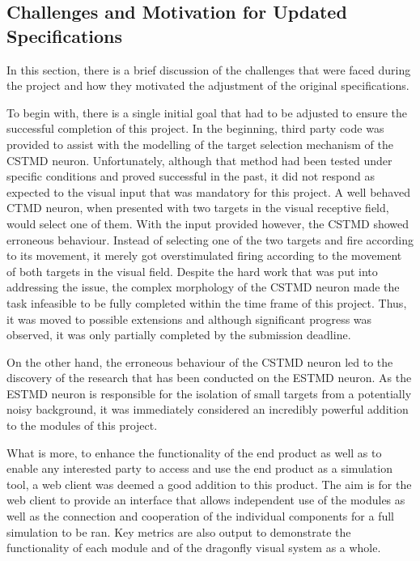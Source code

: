 \documentclass[a4paper,11pt]{article}
\begin{document}
\subsection{Challenges and Motivation for Updated Specifications}
In this section, there is a brief discussion of the challenges that were faced during the project and how they motivated the adjustment of the original specifications.\par
	To begin with, there is a single initial goal that had to be adjusted to ensure the successful completion of this project. In the beginning, third party code was provided to assist with the modelling of the target selection mechanism of the CSTMD neuron. Unfortunately, although that method had been tested under specific conditions and proved successful in the past, it did not respond as expected to the visual input that was mandatory for this project. A well behaved CTMD neuron, when presented with two targets in the visual receptive field, would select one of them. With the input provided however, the CSTMD showed erroneous behaviour. Instead of selecting one of the two targets and fire according to its movement, it merely got overstimulated firing according to the movement of both targets in the visual field. Despite the hard work that was put into addressing the issue, the complex morphology of the CSTMD neuron made the task infeasible to be fully completed within the time frame of this project. Thus, it was moved to possible extensions and although significant progress was observed, it was only partially completed by the submission deadline.\par
	On the other hand, the erroneous behaviour of the CSTMD neuron led to the discovery of the research that has been conducted on the ESTMD neuron. As the ESTMD neuron is responsible for the isolation of small targets from a potentially noisy background, it was immediately considered an incredibly powerful addition to the modules of this project.\par
	What is more, to enhance the functionality of the end product as well as to enable any interested party to access and use the end product as a simulation tool, a web client was deemed a good addition to this product. The aim is for the web client to provide an interface that allows independent use of the modules as well as the connection and cooperation of the individual components for a full simulation to be ran. Key metrics are also output to demonstrate the functionality of each module and of the dragonfly visual system as a whole. 
\end{document}
